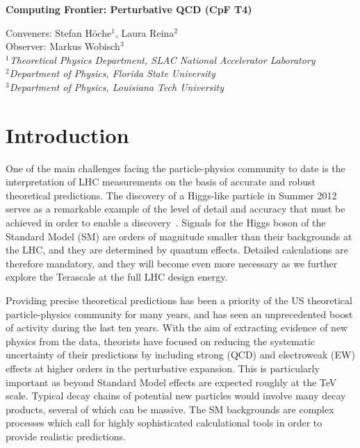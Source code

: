 \documentclass[12pt]{article}
\begin{document}
\begin{center}
{\bf {\Large Computing Frontier: Perturbative QCD (CpF T4)}}
\end{center}

\bigskip

\begin{center}
{\large Conveners: Stefan H{\"o}che$^1$,  Laura Reina$^2$\\
  Observer: Markus Wobisch$^3$} \\
\bigskip
$^1${\it Theoretical Physics Department, SLAC National Accelerator Laboratory}\\
$^2${\it Department of Physics, Florida State University}\\
$^3${\it Department of Physics, Louisiana Tech University }\\
\end{center}

\medskip

\section{Introduction}

One of the main challenges facing the particle-physics community to date
is the interpretation of LHC measurements on the basis of accurate and
robust theoretical predictions.  The discovery of a Higgs-like
particle in Summer 2012~\cite{Aad:2012tfa,Chatrchyan:2012ufa} serves
as a remarkable example of the level of detail and accuracy that must
be achieved in order to enable a
discovery~\cite{Dittmaier:2011ti,Dittmaier:2012vm,Heinemeyer:2013tqa}.
Signals for the Higgs boson of the Standard Model (SM) are orders of 
magnitude smaller than their backgrounds at the LHC, and they are 
determined by quantum effects.  Detailed calculations are therefore 
mandatory, and they will become even more necessary as we further 
explore the Terascale at the full LHC design energy.

Providing precise theoretical predictions has been a priority of the US 
theoretical particle-physics community for many years, and has seen an
unprecedented boost of activity during the last ten years. With the
aim of extracting evidence of new physics from the data, theorists
have focused on reducing the systematic uncertainty of their predictions
by including strong (QCD) and electroweak (EW) effects at higher orders
in the perturbative expansion. This is particularly important as
beyond Standard Model effects are expected roughly at the TeV scale. 
Typical decay chains of potential new particles would involve many 
decay products, several of which can be massive. The SM backgrounds 
are complex processes which call for highly sophisticated calculational 
tools in order to provide realistic predictions.
\end{document}
